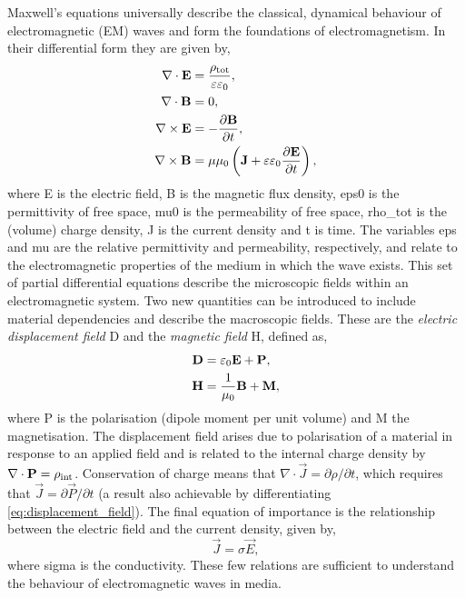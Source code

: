 \documentclass{article}
\begin{document}
Maxwell's equations universally describe the classical, dynamical behaviour of electromagnetic (EM) waves and form the foundations of electromagnetism. In their differential form they are given by,
\begin{subequations}
\begin{align}
\nabla \cdot \mathbf{E} &= \frac{\rho_{\mathrm{tot}}}{\varepsilon\varepsilon_0}, \label{eq:maxwell1}\\
\nabla \cdot \mathbf{B} &= 0, \label{eq:maxwell2}\\
\nabla \times \mathbf{E} &= -\frac{\partial \mathbf{B}}{\partial t}, \label{eq:maxwell3}\\
\nabla \times \mathbf{B} &= \mu\mu_0 \left( \mathbf{J} + \varepsilon\varepsilon_0 \frac{\partial \mathbf{E}}{\partial t} \right), \label{eq:maxwell4}
\end{align}
\end{subequations}
where \gls{E} is the electric field, \gls{B} is the magnetic flux density, \gls{eps0} is the permittivity of free space, \gls{mu0} is the permeability of free space, \gls{rho_tot} is the (volume) charge density, \gls{J} is the current density and \gls{t} is time. The variables \gls{eps} and \gls{mu} are the relative permittivity and permeability, respectively, and relate to the electromagnetic properties of the medium in which the wave exists. This set of partial differential equations describe the microscopic fields within an electromagnetic system.
Two new quantities can be introduced to include material dependencies and describe the macroscopic fields. These are the \textit{electric displacement field} \gls{D} and the \textit{magnetic field} \gls{H}, defined as,
\begin{subequations}
\begin{align}
\mathbf{D} &= \varepsilon_0\mathbf{E} + \mathbf{P}, \label{eq:displacement_field}\\
\mathbf{H} &= \frac{1}{\mu_0}\mathbf{B} + \mathbf{M}, \label{eq:magnetic_field}
\end{align}
\end{subequations}
where \gls{P} is the polarisation (dipole moment per unit volume) and \gls{M} the magnetisation. The displacement field arises due to polarisation of a material in response to an applied field and is related to the internal charge density by $\nabla\cdot\mathbf{P}=\rho_{\mathrm{int}}$. Conservation of charge means that $\nabla\cdot\vec{J}=\partial\rho/\partial t$, which requires that $\vec{J}=\partial\vec{P}/\partial t$ (a result also achievable by differentiating \eqref{eq:displacement_field}). The final equation of importance is the relationship between the electric field and the current density, given by,
\begin{equation}
\vec{J} = \sigma\vec{E},
\label{eq:current_density}
\end{equation}
where \gls{sigma} is the conductivity. These few relations are sufficient to understand the behaviour of electromagnetic waves in media.
\end{document}
